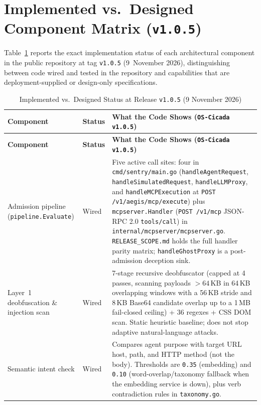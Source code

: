 \documentclass[11pt, a4paper]{article}
\begin{document}
\section{Implemented vs.\ Designed Component Matrix (\texttt{v1.0.5})}
\label{sec:implemented-vs-designed}

Table~\ref{tab:impl-vs-designed} reports the exact implementation status of each architectural component in the public repository at tag \texttt{v1.0.5} (9~November 2026), distinguishing between code wired and tested in the repository and capabilities that are deployment-supplied or design-only specifications.

\begin{small}
\begin{longtable}{@{} p{3.6cm} p{2.6cm} p{9.2cm} @{}}
\caption{Implemented vs.\ Designed Status at Release \texttt{v1.0.5} (9 November 2026)}
\label{tab:impl-vs-designed} \\
\toprule
\textbf{Component} & \textbf{Status} & \textbf{What the Code Shows (\texttt{OS-Cicada} \texttt{v1.0.5})} \\
\midrule
\endfirsthead
\toprule
\textbf{Component} & \textbf{Status} & \textbf{What the Code Shows (\texttt{OS-Cicada} \texttt{v1.0.5})} \\
\midrule
\endhead
\bottomrule
\endfoot
Admission pipeline (\texttt{pipeline.Evaluate}) & Wired & Five active call sites: four in \texttt{cmd/sentry/main.go} (\texttt{handleAgentRequest}, \texttt{handleSimulatedRequest}, \texttt{handleLLMProxy}, and \texttt{handleMCPExecution} at \texttt{POST /v1/aegis/mcp/execute}) plus \texttt{mcpserver.Handler} (\texttt{POST /v1/mcp} JSON-RPC 2.0 \texttt{tools/call}) in \texttt{internal/mcpserver/mcpserver.go}. \texttt{RELEASE\_SCOPE.md} holds the full handler parity matrix; \texttt{handleGhostProxy} is a post-admission deception sink. \\
\addlinespace
Layer~1 deobfuscation \& injection scan & Wired & 7-stage recursive deobfuscator (capped at 4 passes, scanning payloads $>64\,$KB in 64\,KB overlapping windows with a 56\,KB stride and 8\,KB Base64 candidate overlap up to a 1\,MB fail-closed ceiling) + 36 regexes + CSS DOM scan. Static heuristic baseline; does not stop adaptive natural-language attacks. \\
\addlinespace
Semantic intent check & Wired & Compares agent purpose with target URL host, path, and HTTP method (not the body). Thresholds are \texttt{0.35} (embedding) and \texttt{0.10} (word-overlap/taxonomy fallback when the embedding service is down), plus verb contradiction rules in \texttt{taxonomy.go}. \\

\end{longtable}
\end{small}
\end{document}
